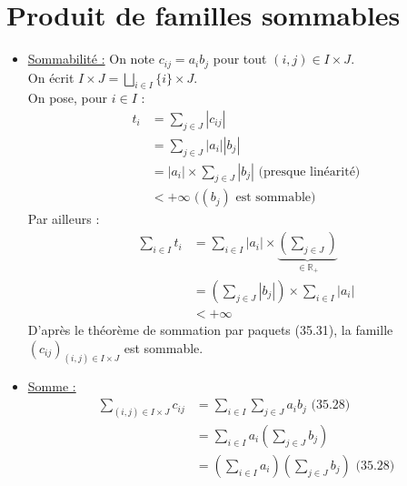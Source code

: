 \documentclass[../main.tex]{subfiles}
\begin{document}
\section{Produit de familles sommables}
\begin{itemize}
    \item \underline{Sommabilité :} On note $c_{ij} = a_i b_j$ pour tout $(i, j)\in I\times J$. \\
    On écrit $I\times J = \bigsqcup\limits_{i\in I} \{i\}\times J$. \\
    On pose, pour $i\in I$ : 
    \begin{align*}
        t_i &= \sum_{j\in J} |c_{ij}| \\
        &= \sum_{j\in J} |a_i||b_j| \\
        &= |a_i| \times \sum_{j\in J} |b_j| \text{ (presque linéarité)} \\
        &< +\infty \text{ ($(b_j)$ est sommable)}
    \end{align*}
    Par ailleurs : 
    \begin{align*}
        \sum_{i\in I} t_i &= \sum_{i\in I} |a_i| \times \underbrace{\left( \sum_{j\in J} \right)}_{\in \mathbb{R}_+} \\
        &= \left( \sum_{j\in J} |b_j| \right) \times \sum_{i\in I} |a_i| \\
        &< +\infty
    \end{align*}
    D'après le théorème de sommation par paquets (35.31), la famille $(c_{ij})_{(i, j)\in I\times J}$ est sommable. 

    \item \underline{Somme :}
    \begin{align*}
        \sum_{(i, j)\in I\times J} c_{ij} &= \sum_{i\in I} \sum_{j\in J} a_i b_j \text{ (35.28)} \\
        &= \sum_{i\in I} a_i \left( \sum_{j\in J} b_j \right) \\
        &= \left( \sum_{i\in I} a_i \right) \left( \sum_{j\in J} b_j \right) \text{ (35.28)}
    \end{align*}
\end{itemize}
\end{document}
